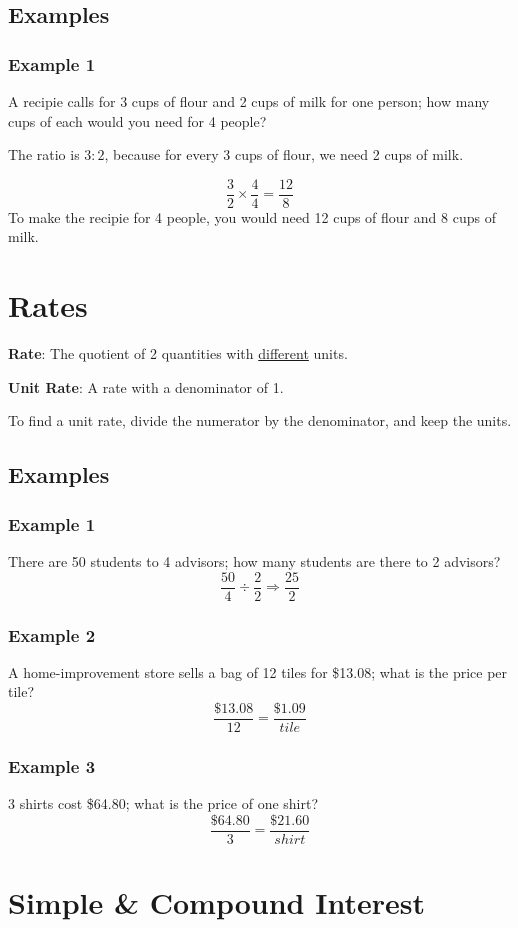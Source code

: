 \documentclass[letterpaper, 10pt]{article}
\begin{document}
\subsection{Examples}
\subsubsection{Example 1}
A recipie calls for 3 cups of flour and 2 cups of milk for one person; how many cups of each would you need for 4 people?

The ratio is $ 3 : 2$, because for every 3 cups of flour, we need 2 cups of milk.

$$
\frac{3}{2} \times \frac{4}{4} = \frac{12}{8}
$$
To make the recipie for 4 people, you would need 12 cups of flour and 8 cups of milk.

\section{Rates}
\textbf{Rate}: The quotient of 2 quantities with \underline{different} units.

\noindent \textbf{Unit Rate}: A rate with a denominator of 1.

To find a unit rate, divide the numerator by the denominator, and keep the units. 
\subsection{Examples}
	\subsubsection{Example 1}
	There are 50 students to 4 advisors; how many students are there to 2 advisors? 
	$$
	\frac{50}{4} \div \frac{2}{2} \Rightarrow \frac{25}{2}
	$$
	\subsubsection{Example 2}
	A home-improvement store sells a bag of 12 tiles for \$13.08; what is the price per tile?
	$$
	\frac{\$13.08}{12} = \frac{\$1.09}{tile}
	$$

	\subsubsection{Example 3}
	3 shirts cost \$64.80; what is the price of one shirt?
	$$
	\frac{\$64.80}{3} = \frac{\$21.60}{shirt}
	$$

\section{Simple \& Compound Interest}
\end{document}
